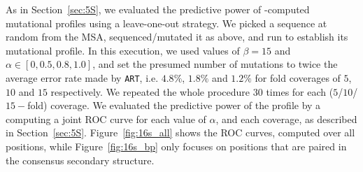 As in Section~\ref{sec:5S}, we evaluated the predictive power of \RNApyro-computed mutational profiles using a leave-one-out strategy. We picked a sequence at random from the MSA, sequenced/mutated it as above, and run \RNApyro to establish its mutational profile. In this execution, we used values of $\beta=15$ and $\alpha\in [0, 0.5, 0.8, 1.0]$, and set the presumed number of mutations to twice the average error rate made by {\tt ART}, i.e. $4.8\%$, $1.8\%$ and $1.2\%$ for fold coverages of $5$, $10$ and $15$ respectively.
We repeated the whole procedure $30$ times for each ($5$/$10$/$15-$fold) coverage. 
We evaluated the predictive power of the profile by a computing a joint ROC curve for each value of $\alpha$, and each coverage, as described in Section~\ref{sec:5S}. Figure~\ref{fig:16s_all} shows the ROC curves, computed over all positions, while Figure~\ref{fig:16s_bp} only focuses on positions that are paired in the consensus secondary structure.



 



